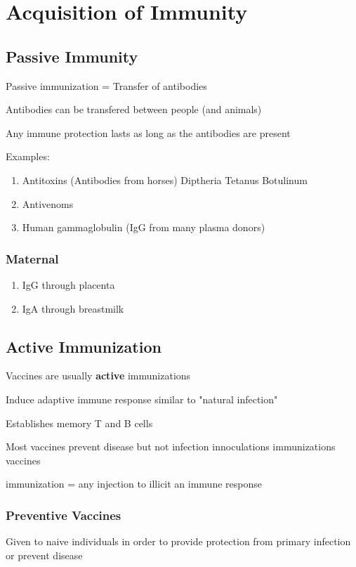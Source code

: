 \documentclass{notes}
\begin{document}
\section*{Acquisition of Immunity}
\subsection*{Passive Immunity}
Passive immunization = Transfer of antibodies

\tab \indicates Antibodies can be transfered between people (and animals)

\tab \indicates Any immune protection lasts as long as the antibodies are present

Examples:
\begin{enumerate}
    \item Antitoxins (Antibodies from horses)
    \subitem Diptheria
    \subitem Tetanus
    \subitem Botulinum
    \item Antivenoms
    \item Human gammaglobulin (IgG from many plasma donors)
\end{enumerate}

\subsubsection*{Maternal}
\begin{enumerate}
    \item IgG through placenta
    \item IgA through breastmilk
\end{enumerate}

\subsection*{Active Immunization}
Vaccines are usually \textbf{active} immunizations

\tab \indicates Induce adaptive immune response similar to "natural infection"

\tab \indicates Establishes memory T and B cells

Most vaccines prevent disease but not infection
innoculations \indicates immunizations \indicates vaccines

immunization = any injection to illicit an immune response


\subsubsection*{Preventive Vaccines}
Given to naive individuals in order to provide protection from primary infection or prevent disease
\end{document}
